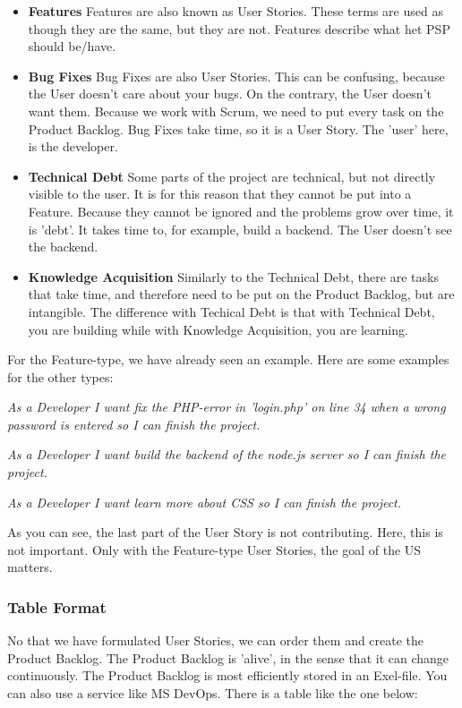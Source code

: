 \documentclass[10pt]{report}
\begin{document}
\begin{itemize}
	\item \textbf{Features} Features are also known as User Stories. These terms are used as though they are the same, but they are not. Features describe what het PSP should be/have.
	\item \textbf{Bug Fixes} Bug Fixes are also User Stories. This can be confusing, because the User doesn't care about your bugs. On the contrary, the User doesn't want them. Because we work with Scrum, we need to put every task on the Product Backlog. Bug Fixes take time, so it is a User Story. The 'user' here, is the developer.
	\item \textbf{Technical Debt} Some parts of the project are technical, but not directly visible to the user. It is for this reason that they cannot be put into a Feature. Because they cannot be ignored and the problems grow over time, it is 'debt'. It takes time to, for example, build a backend. The User doesn't see the backend.
	\item \textbf{Knowledge Acquisition} Similarly to the Technical Debt, there are tasks that take time, and therefore need to be put on the Product Backlog, but are intangible. The difference with Techical Debt is that with Technical Debt, you are building while with Knowledge Acquisition, you are learning.
\end{itemize}

\noindent For the Feature-type, we have already seen an example. Here are some examples for the other types:

\emph{As a Developer I want fix the PHP-error in 'login.php' on line 34 when a wrong password is entered so I can finish the project.}

\emph{As a Developer I want build the backend of the node.js server so I can finish the project.}

\emph{As a Developer I want learn more about CSS so I can finish the project.}

\noindent As you can see, the last part of the User Story is not contributing. Here, this is not important. Only with the Feature-type User Stories, the goal of the US matters.

\subsubsection{Table Format}

No that we have formulated User Stories, we can order them and create the Product Backlog. The Product Backlog is 'alive', in the sense that it can change continuously. The Product Backlog is most efficiently stored in an Exel-file. You can also use a service like MS DevOps. There is a table like the one below:
\end{document}
